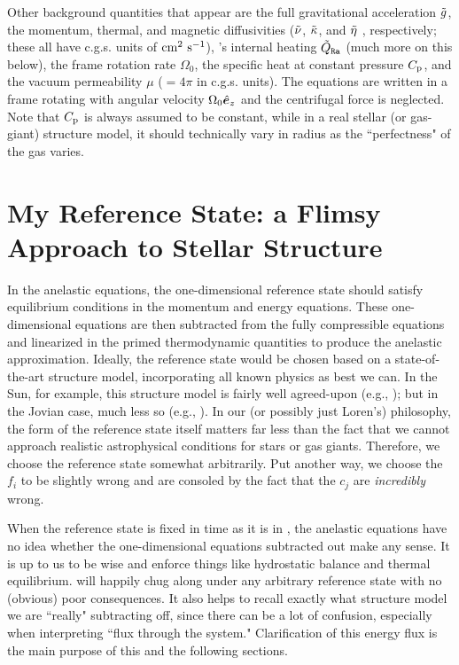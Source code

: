 \documentclass[12pt]{article}
\numberwithin{equation}{section}
\begin{document}
	Other background quantities that appear are the full gravitational acceleration $\tilde{g}$, the momentum, thermal, and magnetic diffusivities ($\tilde{\nu}$, $\tilde{\kappa}$, and $\tilde{\eta}$ , respectively; these all have c.g.s. units of $\rm{cm^2\ s^{-1}}$), {\rayleigh}'s internal heating $\tilde{Q}_{\texttt{Ra}}$ (much more on this below), the frame rotation rate $\Omega_0$, the specific heat at constant pressure $C_{\rm{p}}$, and the vacuum permeability $\mu$ ($=4\pi$ in c.g.s. units). The equations are written in a frame rotating with angular velocity $\Omega_0\hat{\bm{e}}_z$ and the centrifugal force is neglected. Note that $C_{\rm{p}}$ is always assumed to be constant, while in a real stellar (or gas-giant) structure model, it should technically vary in radius as the ``perfectness" of the gas varies. 
	
	\section{My Reference State: a Flimsy Approach to Stellar Structure}\label{sec:ref}
	In the anelastic equations, the one-dimensional reference state should satisfy equilibrium conditions in the momentum and energy equations. These one-dimensional equations are then subtracted from the fully compressible equations and linearized in the primed thermodynamic quantities to produce the anelastic approximation. Ideally, the reference state would be chosen based on a state-of-the-art structure model, incorporating all known physics as best we can. In the Sun, for example, this structure model is fairly well agreed-upon (e.g., \citealt{ChristensenDalsgaard1996}); but in the Jovian case, much less so (e.g., \citealt{Guillot2005}). In our (or possibly just Loren's) philosophy, the form of the reference state itself matters far less than the fact that we cannot approach realistic astrophysical conditions for stars or gas giants. Therefore, we choose the reference state somewhat arbitrarily. Put another way, we choose the $f_i$ to be slightly wrong and are consoled by the fact that the $c_j$ are \textit{incredibly} wrong. 
	
	When the reference state is fixed in time as it is in {\rayleigh}, the anelastic equations have no idea whether the one-dimensional equations subtracted out make any sense. It is up to us to be wise and enforce things like hydrostatic balance and thermal equilibrium. {\rayleigh} will happily chug along under any arbitrary reference state with no (obvious) poor consequences. It also helps to recall exactly what structure model we are ``really" subtracting off, since there can be a lot of confusion, especially when interpreting ``flux through the system." Clarification of this energy flux is the main purpose of this and the following sections. 
	
\end{document}
